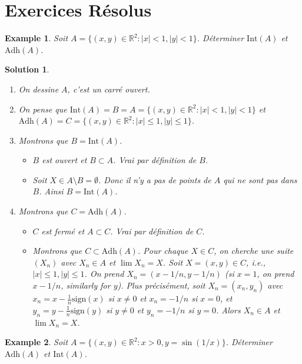 \documentclass{article}
\newtheorem{solution}{Solution}
\newtheorem{example}{Example}
\begin{document}
\section{Exercices Résolus}

\begin{example}
Soit $A = \{(x,y) \in \mathbb{R}^2 : |x| < 1, |y| < 1\}$. Déterminer $\mathrm{Int}(A)$ et $\mathrm{Adh}(A)$.
\end{example}

\begin{solution}
\begin{enumerate}
    \item On dessine $A$, c'est un carré ouvert.
    \item On pense que $\mathrm{Int}(A) = B = A = \{(x,y) \in \mathbb{R}^2 : |x| < 1, |y| < 1\}$ et $\mathrm{Adh}(A) = C = \{(x,y) \in \mathbb{R}^2 : |x| \leq 1, |y| \leq 1\}$.
    \item Montrons que $B = \mathrm{Int}(A)$.
    \begin{itemize}
        \item $B$ est ouvert et $B \subset A$. Vrai par définition de $B$.
        \item Soit $X \in A \setminus B = \emptyset$. Donc il n'y a pas de points de $A$ qui ne sont pas dans $B$. Ainsi $B = \mathrm{Int}(A)$.
    \end{itemize}
    \item Montrons que $C = \mathrm{Adh}(A)$.
    \begin{itemize}
        \item $C$ est fermé et $A \subset C$. Vrai par définition de $C$.
        \item Montrons que $C \subset \mathrm{Adh}(A)$. Pour chaque $X \in C$, on cherche une suite $(X_n)$ avec $X_n \in A$ et $\lim X_n = X$. Soit $X = (x, y) \in C$, i.e., $|x| \leq 1, |y| \leq 1$. On prend $X_n = (x - 1/n, y - 1/n)$ (si $x = 1$, on prend $x - 1/n$, similarly for $y$). Plus précisément, soit $X_n = (x_n, y_n)$ avec $x_n = x - \frac{1}{n} \text{sign}(x)$ si $x \neq 0$ et $x_n = -1/n$ si $x = 0$, et $y_n = y - \frac{1}{n} \text{sign}(y)$ si $y \neq 0$ et $y_n = -1/n$ si $y = 0$. Alors $X_n \in A$ et $\lim X_n = X$.
    \end{itemize}
\end{enumerate}
\end{solution}

\begin{example}
Soit $A = \{(x,y) \in \mathbb{R}^2 : x > 0, y = \sin(1/x)\}$. Déterminer $\mathrm{Adh}(A)$ et $\mathrm{Int}(A)$.
\end{example}
\end{document}
